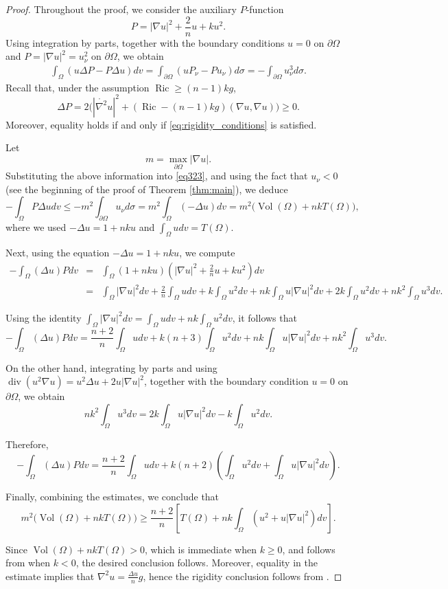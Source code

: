 \documentclass[reqno,11pt]{amsart}
\numberwithin{equation}{section}  %
\begin{document}
\begin{proof}
Throughout the proof, we consider the auxiliary $P$-function
\[P = |\nabla u|^2 +\frac{2}{n}u + ku^2.\]
Using integration by parts, together with the boundary conditions $u = 0$ on $\partial\Omega$ and $P = |\nabla u|^2 = u_{\nu}^2$ on $\partial\Omega$, we obtain
\begin{eqnarray}\label{eq323}
\int_{\Omega}(u\Delta P - P\Delta u)dv = \int_{\partial\Omega}(uP_{\nu} - Pu_{\nu})d\sigma = -\int_{\partial\Omega}u_{\nu}^{3}d\sigma.
\end{eqnarray}
Recall that, under the assumption $\operatorname{Ric}\geq (n-1)kg$,
\[\Delta P = 2\Big(|\mathring{\nabla^2} u|^2 +(\operatorname{Ric} - (n-1)kg)(\nabla u,\nabla u)\Big)\geq 0.\]
Moreover, equality holds if and only if \eqref{eq:rigidity_conditions} is satisfied.

Let
\[m = \max_{\partial\Omega}|\nabla u|.\]
Substituting the above information into \eqref{eq323}, and using the fact that $u_{\nu}<0$ (see the beginning of the proof of Theorem \ref{thm:main}), we deduce
\[-\int_{\Omega}P\Delta udv\leq -m^2\int_{\partial\Omega}u_{\nu}d\sigma = m^2\int_{\Omega}(-\Delta u) dv= m^2\big(\operatorname{Vol}(\Omega) + nkT(\Omega)\big),\]
where we used $-\Delta u = 1 + nku$ and $\int_{\Omega}udv = T(\Omega)$.

Next, using the equation $-\Delta u = 1 + nku$, we compute
\begin{eqnarray*}
-\int_{\Omega}(\Delta u)P dv&=& \int_{\Omega}(1 + nku)\left(|\nabla u|^2 + \frac{2}{n}u + ku^2\right)dv\\
&=&\displaystyle\int_{\Omega}|\nabla u|^2dv + \frac{2}{n}\int_{\Omega}udv + k\int_{\Omega}u^2dv + nk\int_{\Omega}u|\nabla u|^2dv + 2k\int_{\Omega}u^2dv + nk^2\int_{\Omega}u^3dv.
\end{eqnarray*}

Using the identity $\int_{\Omega}|\nabla u|^2dv = \int_{\Omega}udv + nk\int_{\Omega}u^2dv$, it follows that
\[-\int_{\Omega}(\Delta u)P dv= \frac{n+2}{n}\int_{\Omega}udv + k(n+3)\int_{\Omega}u^2dv + nk\int_{\Omega}u|\nabla u|^2dv + nk^2\int_{\Omega}u^3dv.\]

On the other hand, integrating by parts and using $\operatorname{div}(u^2\nabla u) = u^2\Delta u + 2u|\nabla u|^2$, together with the boundary condition $u = 0$ on $\partial\Omega$, we obtain
\[nk^2\int_{\Omega}u^3dv = 2k\int_{\Omega}u|\nabla u|^2dv - k\int_{\Omega}u^2dv.\]

Therefore,
\[-\int_{\Omega}(\Delta u)Pdv = \frac{n+2}{n}\int_{\Omega}udv + k(n+2)\left(\int_{\Omega}u^2dv + \int_{\Omega}u|\nabla u|^2dv\right).\]

Finally, combining the estimates, we conclude that
\[m^2\big(\operatorname{Vol}(\Omega) + nkT(\Omega)\big)\geq \frac{n+2}{n}\left[T(\Omega) + nk\int_{\Omega}\left(u^2 + u|\nabla u|^2\right)dv\right].\]

Since $\operatorname{Vol}(\Omega) + nkT(\Omega) > 0$, which is immediate when $k\geq 0$, and follows from \cite[Lemma 5.2]{andrade2025} when $k<0$, the desired conclusion follows. Moreover, equality in the estimate implies that $\nabla^2 u = \frac{\Delta u}{n}g$, hence the rigidity conclusion follows from \cite[Lemma 6]{farina2022}.
\end{proof}
\end{document}
